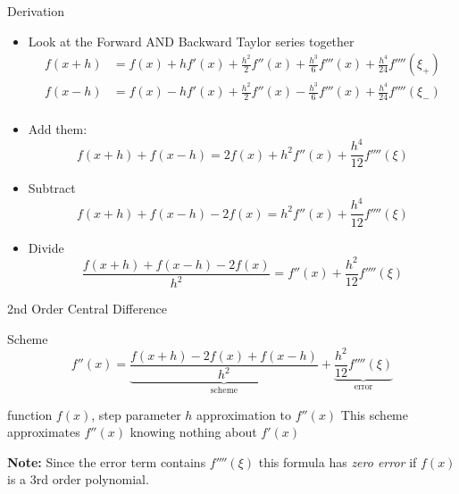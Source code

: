 \documentclass[10pt]{beamer}
\begin{document}
\begin{frame}{Derivation}
\begin{itemize}
    \item Look at the Forward AND Backward Taylor series together
    \begin{align*}
      f(x+h) & = f(x) + h f'(x) + \frac{h^2}{2}f''(x) + \frac{h^3}{6}f'''(x) + \frac{h^4}{24}f''''(\xi_{+})\\
      f(x-h) & = f(x) - h f'(x) + \frac{h^2}{2}f''(x) - \frac{h^3}{6}f'''(x) + \frac{h^4}{24}f''''(\xi_{-})\\
    \end{align*}

    \item<2-> Add them:
    \begin{equation*}
      f(x+h) + f(x-h) = 2 f(x) + h^2f''(x) + \frac{h^4}{12}f''''(\xi)
    \end{equation*}
    \item<3-> Subtract
    \begin{equation*}
      f(x+h) + f(x-h) -2f(x)= h^2f''(x) + \frac{h^4}{12}f''''(\xi)
    \end{equation*}
    \item<4-> Divide
    \begin{equation*}
      \frac{f(x+h) + f(x-h) -2f(x)}{h^2}= f''(x) + \frac{h^2}{12}f''''(\xi)
    \end{equation*}
\end{itemize}
\end{frame}
\begin{frame}{2nd Order Central Difference}

\begin{block}{Scheme}
    $$f''(x) = \underbrace{\frac{f(x+h)-2f(x)+f(x-h)}{h^2}}_{\text{scheme}} + \underbrace{\frac{h^2}{12}f''''(\xi)}_{\text{error}}$$
\end{block}

{function $f(x)$, step parameter $h$}
{approximation to $f''(x)$}
{This scheme approximates $f''(x)$ knowing nothing about $f'(x)$}

\vfill
\textbf{Note:}
Since the error term contains $f''''(\xi)$ this formula has \textit{zero error} if $f(x)$ is a 3rd order polynomial.
\end{frame}


\end{document}
